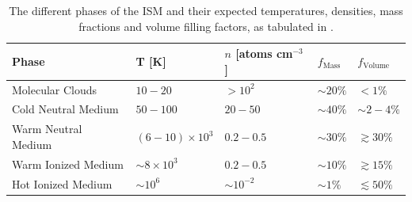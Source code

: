 \begin{table}
	\centering
	\begin{tabular}{p{4cm}|p{2.5cm}|p{2.75cm}|p{1.5cm}|p{2cm}}
		\hline
		\hline
		Phase & T [K] & $n$ [atoms cm$^{-3}$] & $f_{\textrm{Mass}}$ & $f_{\textrm{Volume}}$ \\
		\hline
		\hline
		Molecular Clouds & $10 - 20$ & $>10^2$ & $\sim 20\%$ & $<1\%$ \\
		Cold Neutral Medium & $50 - 100$ & $20 - 50$ & $\sim 40\%$ & $\sim2 - 4 \%$\\
		Warm Neutral Medium & $(6 - 10)\times10^3$ & $0.2 - 0.5$ & $\sim 30\%$ & $\gtrsim 30\%$ \\
		Warm Ionized Medium & $\sim8\times10^3$ & $0.2 - 0.5$ & $\sim 10\%$ & $\gtrsim 15\%$ \\
		Hot Ionized Medium & $\sim10^6$ & $\sim10^{-2}$ & $\sim 1\%$ & $\lesssim 50\%$ \\
		\hline
	\end{tabular}
	\caption[The temperatures, densities, mass and volume filling factors of ISM phases]{The different phases of the ISM and their expected temperatures, densities, mass fractions and volume filling factors, as tabulated in \citealt{Ferriere_2001}.}
	\label{tab:ISM_phases}
\end{table}

